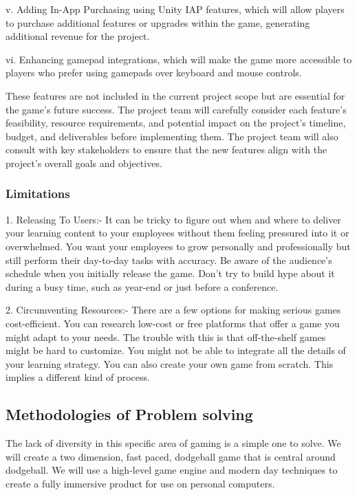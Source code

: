 \documentclass[12pt]{report}
\begin{document}
v. Adding In-App Purchasing using Unity IAP features, which will allow players to purchase additional features or upgrades within the game, generating additional revenue for the project.

vi. Enhancing gamepad integrations, which will make the game more accessible to players who prefer using gamepads over keyboard and mouse controls.

These features are not included in the current project scope but are essential for the game's future success. The project team will carefully consider each feature's feasibility, resource requirements, and potential impact on the project's timeline, budget, and deliverables before implementing them. The project team will also consult with key stakeholders to ensure that the new features align with the project's overall goals and objectives.

\subsubsection{Limitations}
\justifying
\setlength{\parindent}{2em}
\setlength{\parskip}{0.5em}
\renewcommand{\baselinestretch}{1.5}
\normalsize \hspace{1.7cm} 1. Releasing To Users:- It can be tricky to figure out when and where to deliver your learning content to your employees without them feeling pressured into it or overwhelmed. You want your employees to grow personally and professionally but still perform their day-to-day tasks with accuracy. Be aware of the audience’s schedule when you initially release the game. Don’t try to build hype about it during a busy time, such as year-end or just before a conference. 

2. Circumventing Resources:- There are a few options for making serious games cost-efficient. You can research low-cost or free platforms that offer a game you might adapt to your needs. The trouble with this is that off-the-shelf games might be hard to customize. You might not be able to integrate all the details of your learning strategy. You can also create your own game from scratch. This implies a different kind of process. 

\raggedright
\subsection{Methodologies of Problem solving }
\justifying
\setlength{\parindent}{2em}
\setlength{\parskip}{0.5em}
\renewcommand{\baselinestretch}{1.5}
\normalsize \hspace{1.7cm}The lack of diversity in this specific area of gaming is a simple one to solve. We will create a two
dimension, fast paced, dodgeball game that is central around dodgeball. We will use a high-level game engine and modern day techniques to create a fully immersive product for use on personal computers.
\end{document}
